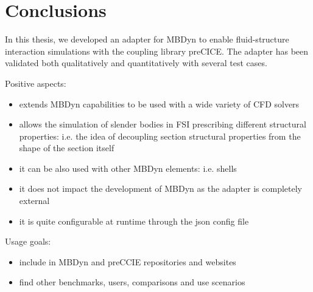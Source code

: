 \chapter{Conclusions}
\label{cha:conclusions}

In this thesis, we  developed an adapter for MBDyn to enable fluid-structure interaction simulations with the coupling library preCICE.
The adapter has been validated both qualitatively and quantitatively with several test cases.

Positive aspects:

\begin{itemize}
	\item extends MBDyn capabilities to be used with a wide variety of CFD solvers
	\item allows the simulation of slender bodies in FSI prescribing different structural properties: i.e. the idea of decoupling section structural properties from the shape of the section itself
	\item it can be also used with other MBDyn elements: i.e. shells
	\item it does not impact the development of MBDyn as the adapter is completely external
	\item it is quite configurable at runtime through the json config file
\end{itemize}


Usage goals:
\begin{itemize}
	\item include in MBDyn and preCCIE repositories and websites
	\item find other benchmarks, users, comparisons and use scenarios
\end{itemize}


